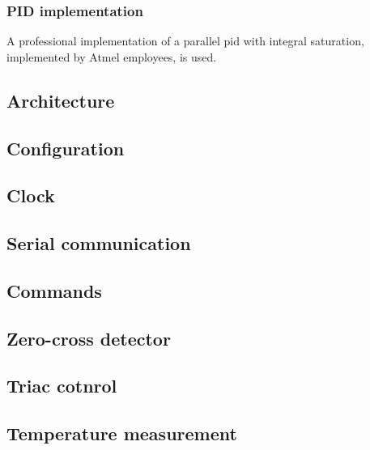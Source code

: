 \subsubsection{PID implementation}
A professional implementation of a parallel pid with integral saturation, implemented by Atmel employees, is used.

\subsection{Architecture}
\subsection{Configuration}
\subsection{Clock}
\subsection{Serial communication}
\subsection{Commands}
\subsection{Zero-cross detector}
\subsection{Triac cotnrol}
\subsection{Temperature measurement}
